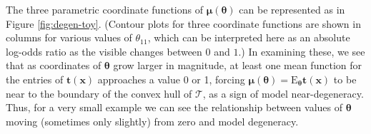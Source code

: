\documentclass[]{article}
\theoremstyle{definition}
\begin{document}
The three parametric coordinate functions of
\(\boldsymbol \mu(\boldsymbol \theta)\) can be represented as in Figure
\ref{fig:degen-toy}. (Contour plots for three coordinate functions are
shown in columns for various values of \(\theta_{11}\), which can be
interpreted here as an absolute log-odds ratio as the visible changes
between \(0\) and \(1\).) In examining these, we see that as coordinates
of \(\boldsymbol \theta\) grow larger in magnitude, at least one mean
function for the entries of \(\boldsymbol t(\boldsymbol x)\) approaches
a value 0 or 1, forcing
\(\boldsymbol \mu(\boldsymbol \theta) = \text{E}_{\boldsymbol \theta} \boldsymbol t(\boldsymbol x)\)
to be near to the boundary of the convex hull of \(\mathcal{T}\), as a
sign of model near-degeneracy. Thus, for a very small example we can see
the relationship between values of \(\boldsymbol \theta\) moving
(sometimes only slightly) from zero and model degeneracy.
\end{document}
